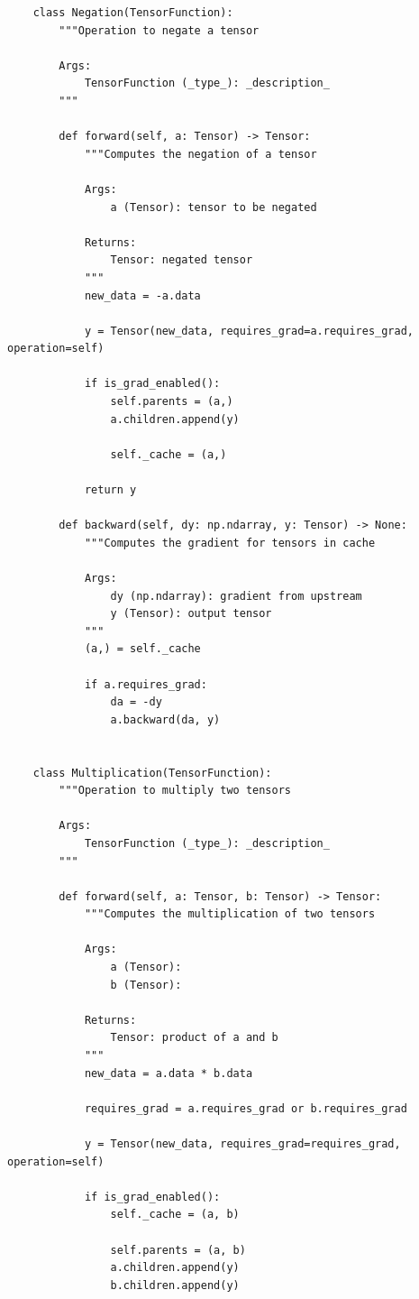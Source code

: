 \documentclass{article}
\begin{document}
\begin{verbatim}
    class Negation(TensorFunction):
        """Operation to negate a tensor

        Args:
            TensorFunction (_type_): _description_
        """

        def forward(self, a: Tensor) -> Tensor:
            """Computes the negation of a tensor

            Args:
                a (Tensor): tensor to be negated

            Returns:
                Tensor: negated tensor
            """
            new_data = -a.data

            y = Tensor(new_data, requires_grad=a.requires_grad, operation=self)

            if is_grad_enabled():
                self.parents = (a,)
                a.children.append(y)

                self._cache = (a,)

            return y

        def backward(self, dy: np.ndarray, y: Tensor) -> None:
            """Computes the gradient for tensors in cache

            Args:
                dy (np.ndarray): gradient from upstream
                y (Tensor): output tensor
            """
            (a,) = self._cache

            if a.requires_grad:
                da = -dy
                a.backward(da, y)


    class Multiplication(TensorFunction):
        """Operation to multiply two tensors

        Args:
            TensorFunction (_type_): _description_
        """

        def forward(self, a: Tensor, b: Tensor) -> Tensor:
            """Computes the multiplication of two tensors

            Args:
                a (Tensor):
                b (Tensor):

            Returns:
                Tensor: product of a and b
            """
            new_data = a.data * b.data

            requires_grad = a.requires_grad or b.requires_grad

            y = Tensor(new_data, requires_grad=requires_grad, operation=self)

            if is_grad_enabled():
                self._cache = (a, b)

                self.parents = (a, b)
                a.children.append(y)
                b.children.append(y)


\end{verbatim}
\end{document}
